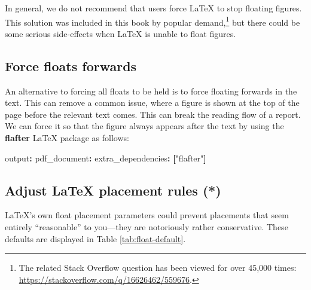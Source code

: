 \documentclass[
  11pt,
]{krantz}
\newenvironment{Shaded}{\begin{snugshade}}{\end{snugshade}}
\newcommand{\AttributeTok}[1]{\textcolor[rgb]{0.61,0.61,0.61}{#1}}
\newcommand{\DataTypeTok}[1]{\textcolor[rgb]{0.27,0.27,0.27}{#1}}
\newcommand{\FunctionTok}[1]{\textcolor[rgb]{0,0,0}{#1}}
\newcommand{\KeywordTok}[1]{\textcolor[rgb]{0.27,0.27,0.27}{\textbf{#1}}}
\newcommand{\NormalTok}[1]{#1}
\newcommand{\OperatorTok}[1]{\textcolor[rgb]{0.43,0.43,0.43}{\textbf{#1}}}
\newcommand{\StringTok}[1]{\textcolor[rgb]{0.5,0.5,0.5}{#1}}
\begin{document}
\begin{Shaded}
\end{Shaded}

In general, we do not recommend that users force LaTeX to stop floating figures. This solution was included in this book by popular demand,\footnote{The related Stack Overflow question has been viewed for over 45,000 times: \url{https://stackoverflow.com/q/16626462/559676}.} but there could be some serious side-effects when LaTeX is unable to float figures.

\hypertarget{force-floats-forwards}{%
\subsection{Force floats forwards}\label{force-floats-forwards}}

An alternative to forcing all floats to be held is to force floating forwards in the text. This can remove a common issue, where a figure is shown at the top of the page before the relevant text comes. This can break the reading flow of a report. We can force it so that the figure always appears after the text by using the \textbf{flafter} LaTeX package as follows:

\begin{Shaded}
\begin{Highlighting}[]
\FunctionTok{output}\KeywordTok{:}\AttributeTok{ }
\AttributeTok{  }\FunctionTok{pdf_document}\KeywordTok{:}
\AttributeTok{    }\FunctionTok{extra_dependencies}\KeywordTok{:}\AttributeTok{ }\KeywordTok{[}\StringTok{"flafter"}\KeywordTok{]}
\end{Highlighting}
\end{Shaded}

\hypertarget{adjust-latex-placement-rules}{%
\subsection{Adjust LaTeX placement rules (*)}\label{adjust-latex-placement-rules}}

LaTeX's own float placement parameters could prevent placements that seem entirely ``reasonable'' to you---they are notoriously rather conservative. These defaults are displayed in Table \ref{tab:float-default}.
\end{document}

